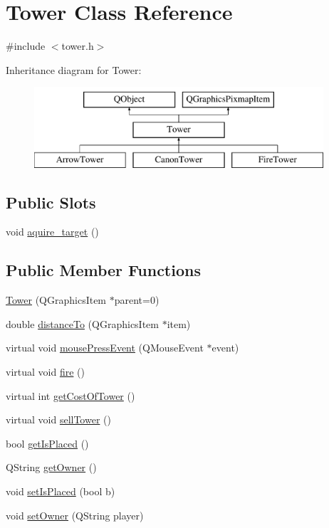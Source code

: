 \hypertarget{class_tower}{}\section{Tower Class Reference}
\label{class_tower}


{\ttfamily \#include $<$tower.\+h$>$}

Inheritance diagram for Tower\+:\begin{figure}[H]
\begin{center}
\leavevmode
\includegraphics[height=3.000000cm]{class_tower}
\end{center}
\end{figure}
\subsection*{Public Slots}
\begin{DoxyCompactItemize}
\item 
void \hyperlink{class_tower_a6e0df1e43e746622967918aaf6f42dce}{aquire\+\_\+target} ()
\end{DoxyCompactItemize}
\subsection*{Public Member Functions}
\begin{DoxyCompactItemize}
\item 
\hyperlink{class_tower_aa3ff2c932ed113a80a122dbe2e3e0176}{Tower} (Q\+Graphics\+Item $\ast$parent=0)
\item 
double \hyperlink{class_tower_a1b04543304dcd92cee3c0909362a9a3f}{distance\+To} (Q\+Graphics\+Item $\ast$item)
\item 
virtual void \hyperlink{class_tower_a11d4b8069b148e8587b2e7bc2d68b55d}{mouse\+Press\+Event} (Q\+Mouse\+Event $\ast$event)
\item 
virtual void \hyperlink{class_tower_aa0c9c780f48cffacd3da6877f5d4fdc2}{fire} ()
\item 
virtual int \hyperlink{class_tower_ae1d3f44d0149c8146ccf6b262a52ddad}{get\+Cost\+Of\+Tower} ()
\item 
virtual void \hyperlink{class_tower_a7736b1132e64e14a977e9e8c91c3338f}{sell\+Tower} ()
\item 
bool \hyperlink{class_tower_a7632139d282286858bcf80fa0044e19b}{get\+Is\+Placed} ()
\item 
Q\+String \hyperlink{class_tower_a36d5430c311d9e0509c1c078ca1876dc}{get\+Owner} ()
\item 
void \hyperlink{class_tower_aaab33d438ff21a9628534b0e027fe4f7}{set\+Is\+Placed} (bool b)
\item 
void \hyperlink{class_tower_a2c56faabb6910f6dadddf61b1decdbf9}{set\+Owner} (Q\+String player)
\end{DoxyCompactItemize}

